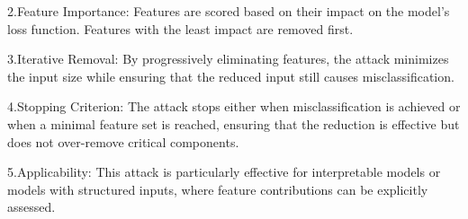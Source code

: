 2.Feature Importance: Features are scored based on their impact on the model's loss function. Features with the least impact are removed first.

3.Iterative Removal: By progressively eliminating features, the attack minimizes the input size while ensuring that the reduced input still causes misclassification.

4.Stopping Criterion: The attack stops either when misclassification is achieved or when a minimal feature set is reached, ensuring that the reduction is effective but does not over-remove critical components.

5.Applicability: This attack is particularly effective for interpretable models or models with structured inputs, where feature contributions can be explicitly assessed.
